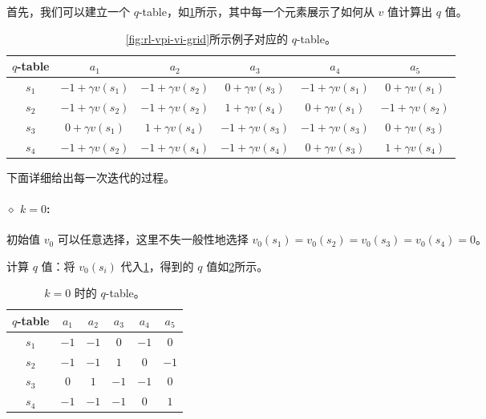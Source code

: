 首先，我们可以建立一个 $q$-table，如\cref{tab:rl-vpi-qtable}所示，其中每一个元素展示了如何从 $v$ 值计算出 $q$ 值。

\begin{table}[H]
\centering
\caption{\cref{fig:rl-vpi-vi-grid}所示例子对应的 $q$-table。}
\label{tab:rl-vpi-qtable}
\begin{tabular}{cccccc}
\toprule
$q$-table & $a_1$ & $a_2$ & $a_3$ & $a_4$ & $a_5$ \\
\midrule
$s_1$ & $-1+\gamma v(s_1)$ & $-1+\gamma v(s_2)$ & $0+\gamma v(s_3)$ & $-1+\gamma v(s_1)$ & $0+\gamma v(s_1)$ \\
$s_2$ & $-1+\gamma v(s_2)$ & $-1+\gamma v(s_2)$ & $1+\gamma v(s_4)$ & $0+\gamma v(s_1)$ & $-1+\gamma v(s_2)$ \\
$s_3$ & $0+\gamma v(s_1)$ & $1+\gamma v(s_4)$ & $-1+\gamma v(s_3)$ & $-1+\gamma v(s_3)$ & $0+\gamma v(s_3)$ \\
$s_4$ & $-1+\gamma v(s_2)$ & $-1+\gamma v(s_4)$ & $-1+\gamma v(s_4)$ & $0+\gamma v(s_3)$ & $1+\gamma v(s_4)$ \\
\bottomrule
\end{tabular}
\end{table}

下面详细给出每一次迭代的过程。

\paragraph{$\diamond$ $k = 0$:}

初始值 $v_{0}$ 可以任意选择，这里不失一般性地选择 $v_{0}(s_{1}) = v_{0}(s_{2}) = v_{0}(s_{3}) = v_{0}(s_{4}) = 0$。

计算 $q$ 值：将 $v_{0}(s_{i})$ 代入\cref{tab:rl-vpi-qtable}，得到的 $q$ 值如\cref{tab:rl-vpi-qtable-k0}所示。

\begin{table}[H]
\centering
\caption{$k = 0$ 时的 $q$-table。}
\label{tab:rl-vpi-qtable-k0}
\begin{tabular}{cccccc}
\toprule
$q$-table & $a_1$ & $a_2$ & $a_3$ & $a_4$ & $a_5$ \\
\midrule
$s_1$ & $-1$ & $-1$ & $0$  & $-1$ & $0$  \\
$s_2$ & $-1$ & $-1$ & $1$  & $0$  & $-1$ \\
$s_3$ & $0$  & $1$  & $-1$ & $-1$ & $0$  \\
$s_4$ & $-1$ & $-1$ & $-1$ & $0$  & $1$  \\
\bottomrule
\end{tabular}
\end{table}

